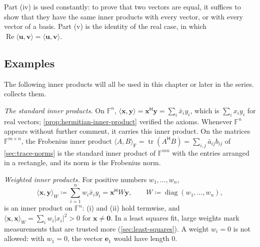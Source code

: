 Part (iv) is used constantly: to prove that two vectors are equal, it suffices to show that they have the same inner products with every vector, or with every vector of a basis. Part (v) is the identity  of the real case, in which $\operatorname{Re}\langle\mathbf u,\mathbf v\rangle=\langle\mathbf u,\mathbf v\rangle$.

\subsection{Examples}

The following inner products will all be used in this chapter or later in the series.  collects them.

\emph{The standard inner products.} On $\mathbb F^n$, $\langle\mathbf x,\mathbf y\rangle=\mathbf x^{\mathsf H}\mathbf y=\sum_i\bar x_iy_i$, which is $\sum_ix_iy_i$ for real vectors; \cref{prop:hermitian-inner-product} verified the axioms. Whenever $\mathbb F^n$ appears without further comment, it carries this inner product. On the matrices $\mathbb F^{m\times n}$, the Frobenius inner product $\langle A,B\rangle_{\mathrm F}=\operatorname{tr}(A^{\mathsf H}B)=\sum_{i,j}\bar a_{ij}b_{ij}$ of \cref{sec:trace-norms} is the standard inner product of $\mathbb F^{mn}$ with the entries arranged in a rectangle, and its norm is the Frobenius norm.

\emph{Weighted inner products.} For positive numbers $w_1,\ldots,w_n$,
\[
\langle\mathbf x,\mathbf y\rangle_W\coloneqq\sum_{i=1}^nw_i\bar x_iy_i=\mathbf x^{\mathsf H}W\mathbf y,\qquad W\coloneqq\operatorname{diag}(w_1,\ldots,w_n),
\]
is an inner product on $\mathbb F^n$: (i) and (ii) hold termwise, and $\langle\mathbf x,\mathbf x\rangle_W=\sum_iw_i|x_i|^2>0$ for $\mathbf x\ne\mathbf 0$. In a least squares fit, large weights mark measurements that are trusted more (\cref{sec:least-squares}). A weight $w_i=0$ is not allowed: with $w_1=0$, the vector $\mathbf e_1$ would have length $0$.

